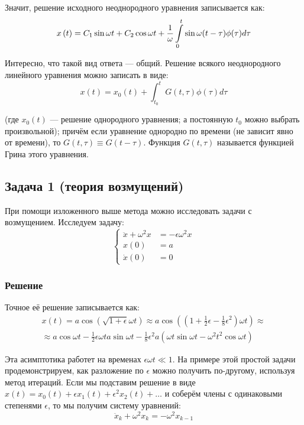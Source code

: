 \documentclass[a4paper,12pt]{article}
\begin{document}
 \noindent
Значит, решение исходного неоднородного уравнения записывается как:
\[
x\left(t\right)=C_{1}\sin\omega t+C_{2}\cos\omega t+\frac{1}{\omega}\intop_{0}^{t}\sin\omega(t-\tau)\phi(\tau)d\tau
\]

 \noindent
Интересно, что такой вид ответа --- общий. Решение всякого неоднородного
линейного уравнения можно записать в виде:
\[
x(t)=x_{0}(t)+\int_{t_0}^{t}G(t,\tau)\phi(\tau)d\tau
\]

 \noindent
(где $x_{0}(t)$ --- решение однородного уравнения; а постоянную $t_0$ можно выбрать произвольной); причём если уравнение
однородно по времени (не зависит явно от времени), то $G(t,\tau)\equiv G(t-\tau)$.
Функция $G(t,\tau)$ называется функцией Грина этого уравнения.


\subsection*{Задача 1 (теория возмущений)}

При помощи изложенного выше метода можно исследовать задачи с возмущением.
Исследуем задачу:
\[
\begin{cases}
\ddot{x}+\omega^{2}x & =-\epsilon\omega^{2}x\\
x\left(0\right) & =a\\
\dot{x}\left(0\right) & =0
\end{cases}
\]



\subsubsection*{Решение}

Точное её решение записывается как:
\begin{multline*}
x(t)=a\cos(\sqrt{1+\epsilon}\omega t)\approx a\cos\left(\left(1+\frac{1}{2}\epsilon-\frac{1}{8}\epsilon^{2}\right)\omega t\right)
\approx \\
\approx a\cos\omega t-\frac{1}{2}\epsilon\omega ta\sin\omega t-\frac{1}{8}\epsilon^{2}a(\omega t\sin\omega t-\omega^{2}t^{2}\cos\omega t)
\end{multline*}

 \noindent
Эта асимптотика работет на временах $\epsilon\omega t\ll1$. На примере
этой простой задачи продемонстрируем, как разложение по $\epsilon$
можно получить по-другому, используя метод итераций. Если мы подставим
решение в виде $x(t)=x_{0}(t)+\epsilon x_{1}(t)+\epsilon^{2}x_{2}(t)+\dots$
и соберём члены с одинаковыми степенями $\epsilon$, то мы получим
систему уравнений:
\[
\ddot{x}_{k}+\omega^{2}x_{k}=-\omega^{2}x_{k-1}
\]
\end{document}
